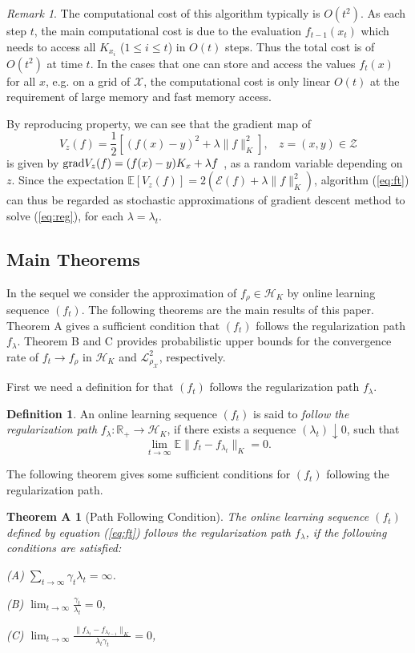\documentclass[twoside,11pt]{amsart}
\theoremstyle{theorem}
\newtheorem*{thma}{Theorem A}
\theoremstyle{definition}
\newtheorem*{defn}{Definition}
\theoremstyle{remark}
\newtheorem{rem}[thm]{Remark}
\newcommand{\DS}{\displaystyle}
\def\Z{{\mathbb Z}}        %
\def\R{{\mathbb R}}        %
\def\E{{\mathbb E}}        %
\def\L{{\mathscr L}}
\def\L2{{\mathscr L}^2_{\rho_\X}}
\def\H{{\mathscr H}}
\def\X{{\mathscr X}}
\def\Z{{\mathscr Z}}
\def\Err{{\mathscr E}}
\def\grad{{\rm grad}}
\def\la{\lambda}
\begin{document}
\begin{rem}
The computational cost of this algorithm typically is $O(t^2)$. As each step $t$, the main computational cost is due to the evaluation $f_{t-1}(x_t)$ which
needs to access all $K_{x_i}$ ($1\leq i\leq t$) in $O(t)$ steps. Thus the total cost is of $O(t^2)$ at time $t$. In the cases that one can store and access
the values $f_t(x)$ for all $x$, e.g. on a grid of $\X$, the computational cost is only linear $O(t)$ at the requirement of large memory and fast memory 
access.
\end{rem}

By reproducing property, we can see that the gradient map of 
$$V_z(f)= \frac{1}{2}[(f(x)-y)^2 + \la \|f\|_K^2], \ \ \ \ z=(x,y)\in \Z$$
is given by $\grad V_z(f)=(f(x)-y)K_{x} +\lambda f$ \cite{SmaYao05}, as a random variable depending on $z$. 
Since the expectation $\E[V_z(f)]=2(\Err(f)+\la\|f\|_K^2)$, algorithm (\ref{eq:ft}) can thus be regarded as 
stochastic approximations of gradient descent method to solve (\ref{eq:reg}), for each $\la=\la_t$. 

\subsection{Main Theorems}

In the sequel we consider the approximation of $f_\rho \in \H_K$ by online learning sequence $(f_t)$. 
The following theorems are the main results of this paper. 
Theorem A gives a sufficient condition that $(f_t)$ follows the regularization path $f_\la$. 
Theorem B and C provides probabilistic upper bounds for the convergence rate of $f_t\to f_\rho$ in $\H_K$ and $\L2$, respectively. 

\medskip

First we need a definition for that $(f_t)$ follows the regularization path $f_\la$.
\begin{defn}
An online learning sequence $(f_t)$ is said to \emph{follow the regularization path} $f_\la:\R_+\to \H_K$, if there exists a sequence $(\la_t)\downarrow 0$, such that
$$\lim_{t\to \infty} \E \|f_t - f_{\la_t} \|_K = 0.$$ 
\end{defn}

The following theorem gives some sufficient conditions for $(f_t)$ following the regularization path. 

\begin{thma} [Path Following Condition]
The online learning sequence $(f_t)$ defined by equation (\ref{eq:ft}) follows the regularization path $f_\la$, 
if the following conditions are satisfied:

\noindent (A) $\DS \sum_{t\to \infty} \gamma_t \la_t = \infty$.

\noindent (B) $\DS \lim_{t\to \infty} \frac{\gamma_t}{\la_t} =0$,

\noindent (C) $\DS \lim_{t\to \infty} \frac{\|f_{\la_t} - f_{\la_{t-1}}\|_K}{\la_t \gamma_t } =0$,
\end{thma}
\end{document}

